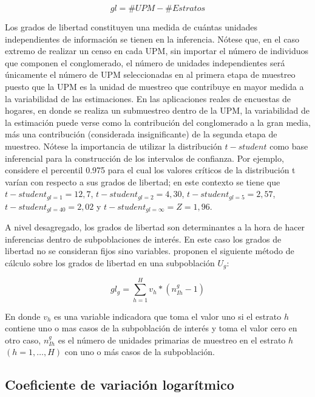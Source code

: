 \documentclass[12pt,spanish,]{book}
\begin{document}
\[
gl = \# UPM - \# Estratos
\]

Los grados de libertad constituyen una medida de cuántas unidades independientes de información se tienen en la inferencia. Nótese que, en el caso extremo de realizar un censo en cada UPM, sin importar el número de individuos que componen el conglomerado, el número de unidades independientes será únicamente el número de UPM seleccionadas en al primera etapa de muestreo puesto que la UPM es la unidad de muestreo que contribuye en mayor medida a la variabilidad de las estimaciones. En las aplicaciones reales de encuestas de hogares, en donde se realiza un submuestreo dentro de la UPM, la variabilidad de la estimación puede verse como la contribución del conglomerado a la gran media, más una contribución (considerada insignificante) de la segunda etapa de muestreo. Nótese la importancia de utilizar la distribución \(t-student\) como base inferencial para la construcción de los intervalos de confianza. Por ejemplo, considere el percentil 0.975 para el cual los valores críticos de la distribución t varían con respecto a sus grados de libertad; en este contexto se tiene que \(t-student_{gl = 1} = 12,7\), \(t-student_{gl = 2} = 4,30\), \(t-student_{gl = 5} = 2,57\), \(t-student_{gl = 40} = 2,02\) y \(t-student_{gl = \infty} = Z = 1,96\).

A nivel desagregado, los grados de libertad son determinantes a la hora de hacer inferencias dentro de subpoblaciones de interés. En este caso los grados de libertad no se consideran fijos sino variables. \textcite[p.~209]{Korn_Graubard_1999} proponen el siguiente método de cálculo sobre los grados de libertad en una subpoblación \(U_g\):

\[
gl_{g} = \sum_{h=1}^H v_h*(n_{Ih}^g - 1)
\]

En donde \(v_h\) es una variable indicadora que toma el valor uno si el estrato \(h\) contiene uno o mas casos de la subpoblación de interés y toma el valor cero en otro caso, \(n_{Ih}^g\) es el número de unidades primarias de muestreo en el estrato \(h\) \((h=1, \ldots, H)\) con uno o más casos de la subpoblación.

\hypertarget{coeficiente-de-variacion-logaritmico}{%
\subsection{Coeficiente de variación logarítmico}\label{coeficiente-de-variacion-logaritmico}}
\end{document}
